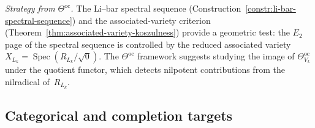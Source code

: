 \begin{enumerate}[resume, label=\textup{(\arabic*)}]
 \smallskip\noindent
 \emph{Strategy from $\Theta^{\mathrm{oc}}$.}
 The Li--bar spectral sequence
 (Construction~\ref{constr:li-bar-spectral-sequence}) and the
 associated-variety criterion
 (Theorem~\ref{thm:associated-variety-koszulness}) provide a
 geometric test: the $E_2$ page of the spectral sequence is
 controlled by the reduced associated variety
 $X_{L_k} = \operatorname{Spec}(R_{L_k}/\sqrt{0})$.
 The $\Theta^{\mathrm{oc}}$ framework suggests studying the
 image of $\Theta^{\mathrm{oc}}_{V_k}$ under the quotient
 functor, which detects nilpotent contributions from the
 nilradical of~$R_{L_k}$.

\end{enumerate}

\subsection{Categorical and completion targets}


